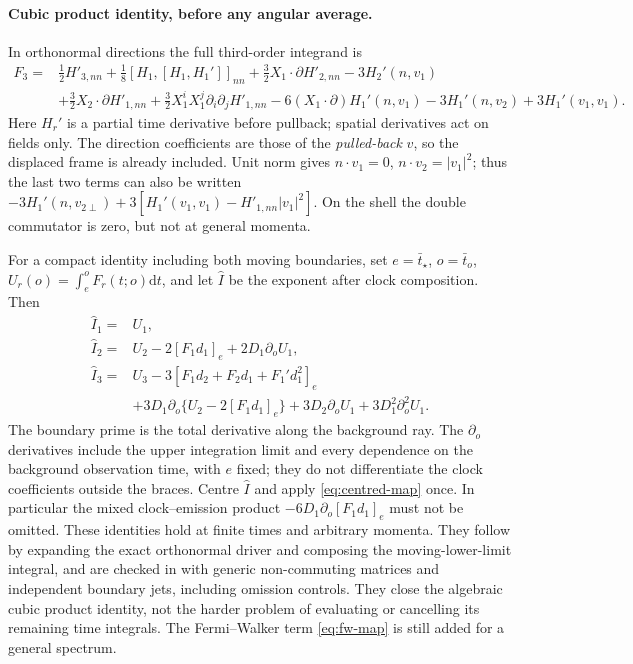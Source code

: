 \documentclass[11pt]{article}
\theoremstyle{definition}
\theoremstyle{remark}
\newcommand{\dd}{\mathrm{d}}
\begin{document}
\paragraph{Cubic product identity, before any angular average.}
In orthonormal directions the full third-order integrand is
\begin{equation}\label{eq:cubic-orthonormal}
\begin{split}
F_3={}&\tfrac12H'_{3,nn}+\tfrac18[H_1,[H_1,H_1']]_{nn}
+\tfrac32X_1\cdot\partial H'_{2,nn}-3H_2'(n,v_1)\\
&+\tfrac32X_2\cdot\partial H'_{1,nn}
+\tfrac32X_1^iX_1^j\partial_i\partial_jH'_{1,nn}
-6(X_1\cdot\partial)H_1'(n,v_1)
-3H_1'(n,v_2)+3H_1'(v_1,v_1).
\end{split}
\end{equation}
Here $H_r'$ is a partial time derivative before pullback; spatial derivatives act on fields
only. The direction coefficients are those of the \emph{pulled-back} $v$, so the displaced
frame is already included. Unit norm gives $n\cdot v_1=0$, $n\cdot v_2=|v_1|^2$; thus the
last two terms can also be written
$-3H_1'(n,v_{2\perp})+3[H_1'(v_1,v_1)-H'_{1,nn}|v_1|^2]$.
On the shell the double commutator is zero, but not at general momenta.

For a compact identity including both moving boundaries, set
$e=\bar t_\star$, $o=\bar t_o$, $U_r(o)=\int_e^oF_r(t;o)\dd t$, and let
$\widehat I$ be the exponent after clock composition. Then
\begin{equation}\label{eq:cubic-composed}
\boxed{\begin{aligned}
\widehat I_1={}&U_1,\\
\widehat I_2={}&U_2-2[F_1d_1]_e+2D_1\partial_oU_1,\\
\widehat I_3={}&U_3-3[F_1d_2+F_2d_1+F_1'd_1^2]_e\\
&+3D_1\partial_o\{U_2-2[F_1d_1]_e\}
+3D_2\partial_oU_1+3D_1^2\partial_o^2U_1.
\end{aligned}}
\end{equation}
The boundary prime is the total derivative along the background ray. The $\partial_o$
derivatives include the upper integration limit and every dependence on the background
observation time, with $e$ fixed; they do not differentiate the clock coefficients outside
the braces. Centre $\widehat I$ and apply \eqref{eq:centred-map} once. In particular the
mixed clock--emission product $-6D_1\partial_o[F_1d_1]_e$ must not be omitted.
These identities hold at finite times and arbitrary momenta. They follow by expanding the
exact orthonormal driver and composing the moving-lower-limit integral, and are checked in
 with generic non-commuting matrices and
independent boundary jets, including omission controls. They close the algebraic cubic
product identity, not the harder problem of evaluating or cancelling its remaining time
integrals. The Fermi--Walker term \eqref{eq:fw-map} is still added for a general spectrum.
\end{document}
